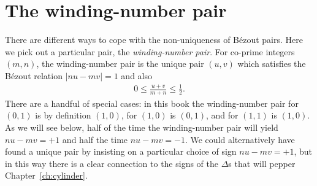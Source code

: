 \section{The winding-number pair}
\label{sec:wnp}
There are different ways to cope with the non-uniqueness of  B\'ezout pairs.
Here we pick out a particular pair, the \textit{winding-number pair}. 
For co-prime integers  $(m,n)$, the winding-number pair is the unique pair  $(u,v)$ which satisfies the B\'ezout relation $|n  u-mv| = 1$ and also
\begin{align}
	0\leq \frac{u+v}{m+n}\leq \frac{1}{2}. \label{eq:wnpFarey}
\end{align}
There are a handful of special cases: in this book the winding-number pair for  $(0,1)$ is by definition $(1,0)$, for $(1,0)$ is $(0,1)$, and for $(1,1)$ is $(1,0)$. 
As we will see below, half of the time the winding-number pair will yield $nu-mv=+1$ and half the time $n u-m v=-1$. We could alternatively have found a unique pair by insisting on a particular choice of sign $nu-mv=+1$, but in this way there is a clear connection to the signs of the $\Delta$s that will pepper Chapter~\ref{ch:cylinder}.



